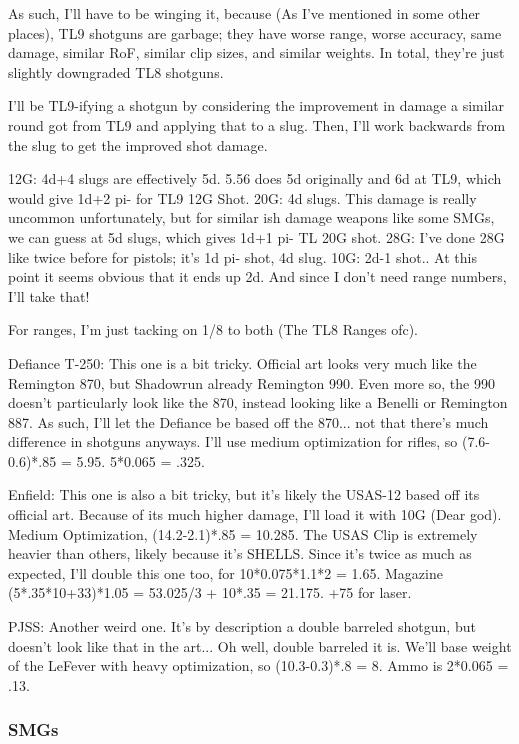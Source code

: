 \begin{multicols*}{2}
	As such, I'll have to be winging it, because (As I've mentioned in some other places), TL9 shotguns are garbage; they have worse range, worse accuracy, same damage, similar RoF, similar clip sizes, and similar weights. In total, they're just slightly downgraded TL8 shotguns. 
	
	I'll be TL9-ifying a shotgun by considering the improvement in damage a similar round got from TL9 and applying that to a slug. Then, I'll work backwards from the slug to get the improved shot damage. 
	
	12G: 4d+4 slugs are effectively 5d. 5.56 does 5d originally and 6d at TL9, which would give 1d+2 pi- for TL9 12G Shot.
	20G: 4d slugs. This damage is really uncommon unfortunately, but for similar ish damage weapons like some SMGs, we can guess at 5d slugs, which gives 1d+1 pi- TL 20G shot.
	28G: I've done 28G like twice before for pistols; it's 1d pi- shot, 4d slug.
	10G: 2d-1 shot.. At this point it seems obvious that it ends up 2d. And since I don't need range numbers, I'll take that!
	
	For ranges, I'm just tacking on 1/8 to both (The TL8 Ranges ofc).
	
	Defiance T-250: This one is a bit tricky. Official art looks very much like the Remington 870, but Shadowrun already Remington 990. Even more so, the 990 doesn't particularly look like the 870, instead looking like a Benelli or Remington 887. As such, I'll let the Defiance be based off the 870... not that there's much difference in shotguns anyways. I'll use medium optimization for rifles, so (7.6-0.6)*.85 = 5.95. 5*0.065 = .325.
	
	Enfield: This one is also a bit tricky, but it's likely the USAS-12 based off its official art. Because of its much higher damage, I'll load it with 10G (Dear god). Medium Optimization, (14.2-2.1)*.85 = 10.285. The USAS Clip is extremely heavier than others, likely because it's SHELLS. Since it's twice as much as expected, I'll double this one too, for 10*0.075*1.1*2 = 1.65. Magazine (5*.35*10+33)*1.05 = 53.025/3 + 10*.35 = 21.175. +75 for laser.
	
	PJSS: Another weird one. It's by description a double barreled shotgun, but doesn't look like that in the art... Oh well, double barreled it is. We'll base weight of the LeFever with heavy optimization, so (10.3-0.3)*.8 = 8. Ammo is  2*0.065 = .13.
	
	\subsubsection{SMGs}
	

\end{multicols*}
